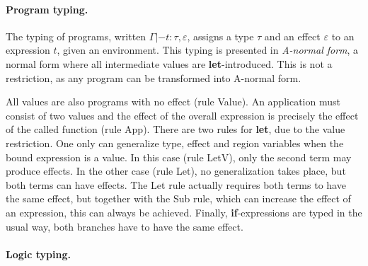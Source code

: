 \documentclass[a4paper]{llncs}
\newcommand{\letml}{{\bf let}}
\newcommand{\ifml}{{\bf if}}
\begin{document}
\paragraph{Program typing.}
The typing of programs, written $Γ|- t : τ,ε$, assigns a type $τ$ and an
effect $ε$ to an expression $t$, given an environment. This typing is
presented in {\em A-normal form}, a normal form where all intermediate values
are \letml-introduced. This is not a restriction, as any program can be
transformed into A-normal form.

All values are also programs with no effect (rule {\sc
Value}). An application must consist of two values and the effect of the
overall expression is precisely the effect of the called function (rule {\sc
App}). There are two rules for \letml, due to the value restriction. One only
can generalize type, effect and region variables when the bound expression is
a value. In this case (rule {\sc LetV}), only the second term may produce
effects. In the other case (rule {\sc Let}), no generalization takes place,
but both terms can have effects. The {\sc Let} rule actually requires both
terms to have the same effect, but together with the {\sc Sub} rule, which can
increase the effect of an expression, this can always be achieved.
Finally, \ifml-expressions are typed in the usual way, both branches have to
have the same effect.

\paragraph{Logic typing.}
\end{document}
